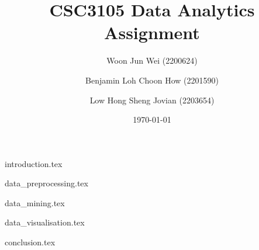 \documentclass[
	article, %
	11pt, %
]{CSUniSchoolLabReport}
\title{CSC3105 Data Analytics Assignment} %
\author[1]{Woon Jun Wei (2200624)}
\author[1]{Benjamin Loh Choon How (2201590)}
\author[1]{Low Hong Sheng Jovian (2203654)}
\affil[1]{Team 14}
\date{\today} %
\begin{document}
\maketitle %

\pagebreak
\tableofcontents
\pagebreak

{introduction.tex}


{data_preprocessing.tex}

{data_mining.tex}

{data_visualisation.tex}

{conclusion.tex}



\end{document}
